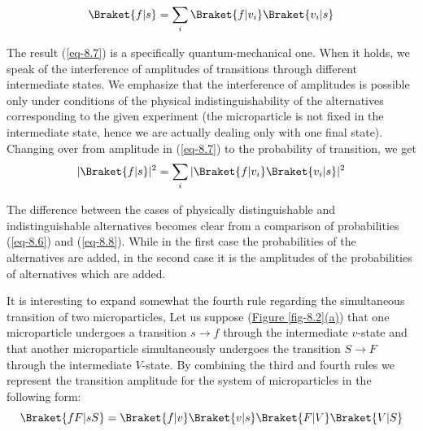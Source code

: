 \documentclass[a4paper,sfsidenotes,colorlinks=true]{tufte-book}
\numberwithin{equation}{section}
\numberwithin{figure}{section}
\begin{document}
\begin{equation}%
\Braket{f |s} =  \sum_{i} \Braket{f|v_{i}} \Braket{v_{i}|s}
\label{eq-8.7} 
\end{equation}

The result (\ref{eq-8.7}) is a specifically quantum-mechanical
one. When it holds, we speak of the interference of amplitudes of
transitions through different intermediate states. We emphasize that
the interference of amplitudes is possible only under conditions of
the physical indistinguishability of the alternatives corresponding to
the given experiment (the microparticle is not fixed in the
intermediate state, hence we are actually dealing only with one final
state). Changing over from amplitude in (\ref{eq-8.7}) to the
probability of transition, we get
\begin{equation}%
|\Braket{f |s}|^{2} =  \sum_{i} |\Braket{f|v_{i}} \Braket{v_{i}|s}|^{2}
\label{eq-8.8} 
\end{equation}

The difference between the cases of physically distinguishable and
indistinguishable alternatives becomes clear from a comparison of
probabilities (\ref{eq-8.6}) and (\ref{eq-8.8}). While in the first
case the probabilities of the alternatives are added, in the second
case it is the amplitudes of the probabilities of alternatives which
are added.


It  is interesting
to expand somewhat the fourth rule regarding the simultaneous
transition of two microparticles, Let us suppose
(\hyperref[fig-8.2]{Figure \ref{fig-8.2}(a)}) that one microparticle
undergoes a transition $s \to f$ through the intermediate $v$-state and
that another microparticle simultaneously undergoes the transition $S
\to F$ through the intermediate $V$-state. By combining the third and
fourth rules we represent the transition amplitude for the system of
microparticles in the following form: 
\begin{equation}%
\Braket{fF |sS} =  \Braket{f|v} \Braket{v|s} \Braket{F|V} \Braket{V|S}
\label{eq-8.9} 
\end{equation}
\end{document}
